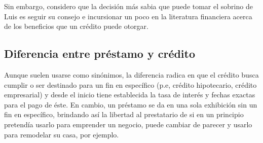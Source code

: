 \documentclass[12pt]{article}
\begin{document}
            Sin embargo, considero que la decisión más sabia que puede tomar el sobrino de Luis es seguir su consejo e incursionar un poco en la literatura financiera acerca de los beneficios que un crédito puede otorgar. 
        \subsection{Diferencia entre préstamo y crédito}
            Aunque suelen usarse como sinónimos, la diferencia radica en que el crédito busca cumplir o ser destinado para un fin en específico (p.e, crédito hipotecario, crédito empresarial) y desde el inicio tiene establecida la tasa de interés y fechas exactas para el pago de éste. En cambio, un préstamo se da en una sola exhibición sin un fin en específico, brindando así la libertad al prestatario de si en un principio pretendía usarlo para emprender un negocio, puede cambiar de parecer y usarlo para remodelar su casa, por ejemplo. 
    \printbibliography
\end{document}
